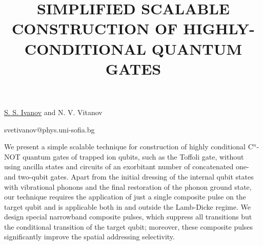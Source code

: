 \title{SIMPLIFIED SCALABLE CONSTRUCTION OF HIGHLY-CONDITIONAL QUANTUM GATES}

\underline{S. S. Ivanov} and N. V. Vitanov

{\normalsize{
\vspace{-4mm}\unisofia

\email svetivanov@phys.uni-sofia.bg}}

We present a simple scalable technique for construction of highly conditional C$^n$-NOT quantum gates of trapped ion qubits, such as the Toffoli gate, without using ancilla states and circuits of an exorbitant number of concatenated one- and two-qubit gates.
Apart from the initial dressing of the internal qubit states with vibrational phonons and the final restoration of the phonon ground state,
our technique requires the application of just a single composite pulse on the target qubit and is applicable both in and outside the Lamb-Dicke regime. We design special narrowband composite pulses, which suppress all transitions but the conditional transition of the target qubit;
moreover, these composite pulses significantly improve the spatial addressing selectivity.

\vspace{\baselineskip} 